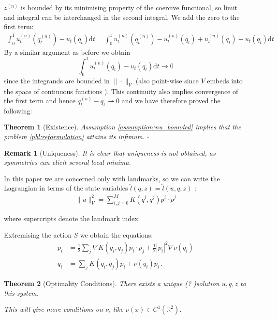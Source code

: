 \documentclass{article}
\newtheorem{theorem}{Theorem}
\newtheorem{remark}{Remark}
\newcommand{\norm}[2]{\| #1 \|_{ #2 }}
\newcommand{\vnorm}[1]{\norm{ #1 }{V}}
\newcommand{\diff}[1]{\text{d} #1}
\newcommand{\RdM}{\mathbb{R}^{d\times M}}
\begin{document}
$z^{(n)}$ is bounded by its minimising property of the coercive functional, so
limit and integral can be interchanged in the second integral. We add the zero
to the first term:
\begin{align*}
\int_0^1 u_t^{(n)}(q_t^{(n)}) -  u_t(q_t)\diff{t} = 
\int_0^1 u_t^{(n)}(q_t^{(n)}) - u_t^{(n)}(q_t) + u_t^{(n)}(q_t) - u_t(q_t)\diff{t}
\end{align*}
By a similar argument as before we obtain 
\[
\int_0^1 u_t^{(n)}(q_t) - u_t(q_t)\diff{t} \rightarrow 0
\]
since the integrands are bounded in $\vnorm{\cdot}$ (also point-wise since $V$
embeds into the space of continuous functions \cite{something}). This continuity
also implies convergence of the first term and hence $q_t^{(n)} -
q_t\rightharpoonup 0$ and we have therefore proved the following: 

\begin{theorem}[Existence]
Assumption \ref{assumption:nu_bounded} implies that the problem
\eqref{pbl:reformulation} attains its infimum.
{\hfill $\square$}
\end{theorem}

\begin{remark}[Uniqueness]
It is clear that uniqueness is not obtained, as symmetries can elicit several
local minima.
\end{remark}

In this paper we are concerned only with
landmarks, so we can write the Lagrangian in terms of the state variables $\hat
l(q, z) = \hat l(u, q, z)$ \cite{younes2010shapes}:
\begin{align*}
\vnorm{u}^2 = \sum_{i,j=0}^M K(q^i,q^j) p^i \cdot p^j
\end{align*}

where supercripts denote the landmark index. 

Extremising the action $S$ we obtain the equations: 
\begin{align}\label{pq:optimality}
\dot p_i & =\frac12 \sum_j \nabla K(q_i,q_j)p_i\cdot p_j  + \frac12 |p_i|^2 \nabla \nu(q_i)\\
\dot q_i & = \sum_j K(q_i,q_j)p_i + \nu(q_i)p_i\, . 
\end{align}

\begin{theorem}[Optimality Conditions]
There exists a unique (? )solution $u, q, z$ to this system.

This will give more conditions on $\nu$, like $\nu(x) \in C^{1}(\mathbb R^2)$. 
\end{theorem}
\end{document}
